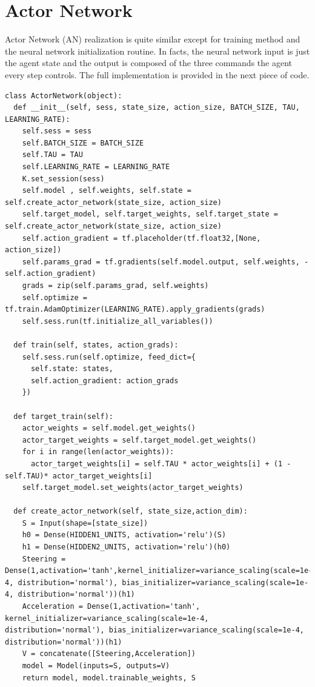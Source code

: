 \documentclass[Lau,oneside,noexaminfo]{sapthesis} %
\begin{document}
\section{Actor Network}
Actor Network (AN) realization is quite similar except for training method and the neural network initialization routine. In facts, the neural network input is just the agent state and the output is composed of the three commands the agent every step controls. The full implementation is provided in the next piece of code.
\begin{lstlisting}
class ActorNetwork(object):
  def __init__(self, sess, state_size, action_size, BATCH_SIZE, TAU, LEARNING_RATE):
    self.sess = sess
    self.BATCH_SIZE = BATCH_SIZE
    self.TAU = TAU
    self.LEARNING_RATE = LEARNING_RATE
    K.set_session(sess)
    self.model , self.weights, self.state = self.create_actor_network(state_size, action_size)   
    self.target_model, self.target_weights, self.target_state = self.create_actor_network(state_size, action_size) 
    self.action_gradient = tf.placeholder(tf.float32,[None, action_size])
    self.params_grad = tf.gradients(self.model.output, self.weights, -self.action_gradient)
    grads = zip(self.params_grad, self.weights)
    self.optimize = tf.train.AdamOptimizer(LEARNING_RATE).apply_gradients(grads)
    self.sess.run(tf.initialize_all_variables())

  def train(self, states, action_grads):
    self.sess.run(self.optimize, feed_dict={
      self.state: states,
      self.action_gradient: action_grads
    })

  def target_train(self):
    actor_weights = self.model.get_weights()
    actor_target_weights = self.target_model.get_weights()
    for i in range(len(actor_weights)):
      actor_target_weights[i] = self.TAU * actor_weights[i] + (1 - self.TAU)* actor_target_weights[i]
    self.target_model.set_weights(actor_target_weights)

  def create_actor_network(self, state_size,action_dim):
    S = Input(shape=[state_size])   
    h0 = Dense(HIDDEN1_UNITS, activation='relu')(S)
    h1 = Dense(HIDDEN2_UNITS, activation='relu')(h0)
    Steering = Dense(1,activation='tanh',kernel_initializer=variance_scaling(scale=1e-4, distribution='normal'), bias_initializer=variance_scaling(scale=1e-4, distribution='normal'))(h1)
    Acceleration = Dense(1,activation='tanh', kernel_initializer=variance_scaling(scale=1e-4, distribution='normal'), bias_initializer=variance_scaling(scale=1e-4, distribution='normal'))(h1)
    V = concatenate([Steering,Acceleration])         
    model = Model(inputs=S, outputs=V)
    return model, model.trainable_weights, S
\end{lstlisting}
\end{document}

